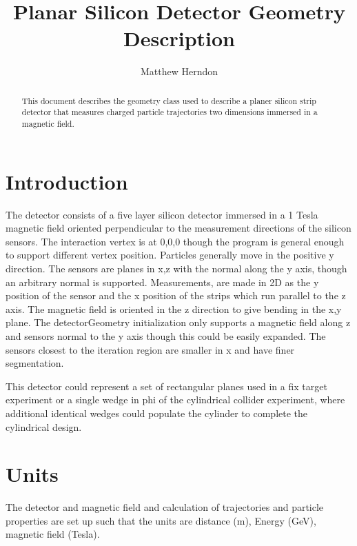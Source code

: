 \documentclass[aps,prd,superscriptaddress,floatfix]{revtex4}
\begin{document}


\title{  
\vspace{0.5cm}
Planar Silicon Detector Geometry Description
}

\author {Matthew Herndon}

\address{University of Wisconsin, Madison, Wisconsin, USA}


\begin{abstract}
\vskip 0.5cm
\noindent
This document describes the geometry class used to describe a planer silicon strip
detector that measures charged particle trajectories two dimensions immersed in a magnetic field.  
\end{abstract}
\maketitle


\vspace{0.3cm}

\section{Introduction}
The detector consists of a five layer silicon detector immersed in a 1
Tesla magnetic field oriented perpendicular to the measurement
directions of the silicon sensors.  The interaction vertex is at 0,0,0 though
the program is general enough to support different vertex position.  Particles
generally move in the positive y direction.  The sensors are planes in x,z with
the normal along the y axis, though an arbitrary normal is supported.  Measurements,
are made in 2D as the y position of the sensor and the x position of the strips which
run parallel to the z axis.  The magnetic field is oriented in the z direction to give
bending in the x,y plane.  The detectorGeometry initialization only supports a magnetic 
field along z and sensors normal to the y axis though this could be easily expanded.
The sensors closest to the iteration region are smaller in x and have finer segmentation.

This detector could represent a set of rectangular planes used in a fix target experiment
or a single wedge in phi of the cylindrical collider experiment, where additional identical
wedges could populate the cylinder to complete the cylindrical design.

\section{Units}
 The detector and magnetic field and calculation of trajectories and particle properties are set up such that the units are distance (m), Energy (GeV), magnetic field (Tesla).
\end{document}
